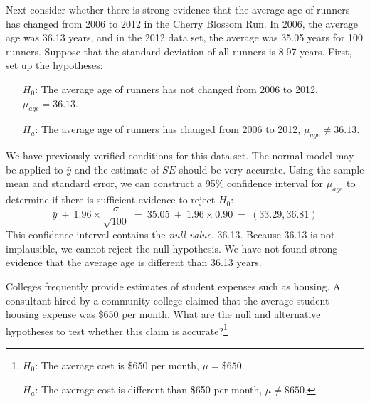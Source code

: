 \begin{example}{Next consider whether there is strong evidence that the average age of runners has changed from 2006 to 2012 in the Cherry Blossom Run. In 2006, the average age was 36.13 years, and in the 2012  data set, the average was 35.05 years for 100 runners.
Suppose that the standard deviation of all runners is 8.97 years.}
First, set up the hypotheses:
\begin{itemize}
\setlength{\itemsep}{0mm}
\item[$H_0$:] The average age of runners has not changed from 2006 to 2012, $\mu_{age} = 36.13$.
\item[$H_a$:] The average age of runners has changed from 2006 to 2012, $\mu_{age} \neq 36.13$.
\end{itemize}
We have previously verified conditions for this data set. The normal model may be applied to $\bar{y}$ and the estimate of $SE$ should be very accurate. Using the sample mean and standard error, we can construct a 95\% confidence interval for $\mu_{age}$ to determine if there is sufficient evidence to reject $H_0$:
\begin{equation*}
\bar{y}\ \pm\ 1.96 \times  \frac{\sigma}{\sqrt{100}}  ~=~ 35.05\ \pm\ 1.96\times 0.90 ~=~ (33.29, 36.81)
\end{equation*}
This confidence interval contains the \emph{null value}, 36.13. Because 36.13 is not implausible, we cannot reject the null hypothesis. We have not found strong evidence that the average age is different than 36.13 years.
\end{example}

\begin{exercise} \label{htForHousingExpenseForCommunityCollege650}
Colleges frequently provide estimates of student expenses such as housing. A consultant hired by a community college claimed that the average student housing expense was \$650 per month. What are the null and alternative hypotheses to test whether this claim is accurate?\footnote{$H_0$: The average cost is \$650 per month, $\mu = \$650$.

\hspace{3.4mm}$H_a$: The average cost is different than \$650 per month, $\mu \neq \$650$.}
\end{exercise}

